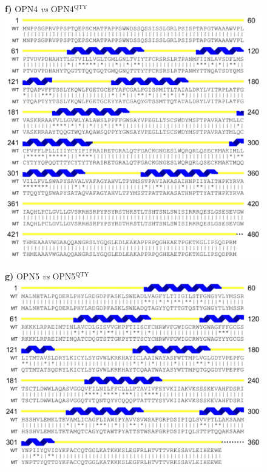 \documentclass[fleqn,12pt]{supp}
\begin{document}
\newpage
\begin{figure}[H]
    \textbf{f)} OPN4 \textit{vs} OPN4$^{\textrm{QTY}}$ \\
    \includegraphics[width=\linewidth]{SuppFigures/opn4.jpg}
\end{figure}

\newpage
\begin{figure}[H]
    \textbf{g)} OPN5 \textit{vs} OPN5$^{\textrm{QTY}}$ \\
    \includegraphics[width=\linewidth]{SuppFigures/opn5.jpg}
\end{figure}
\end{document}

